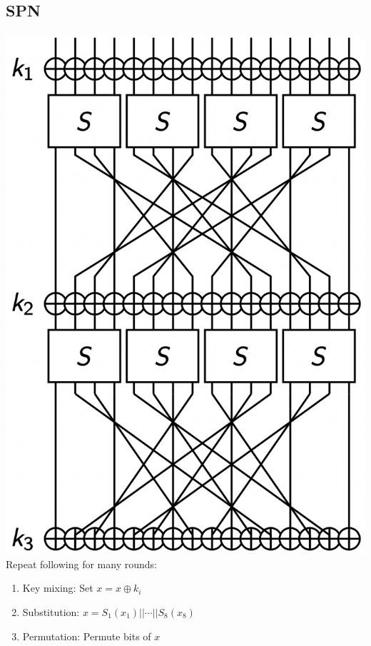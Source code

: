 \subsection*{SPN}
\includegraphics[width=\columnwidth]{SPN.png}\\
Repeat following for many rounds:
\begin{enumerate}
    \item Key mixing: Set $x=x\oplus k_i$
    \item Substitution: $x=S_1(x_1)||\cdots||S_8(x_8)$
    \item Permutation: Permute bits of $x$
\end{enumerate}
